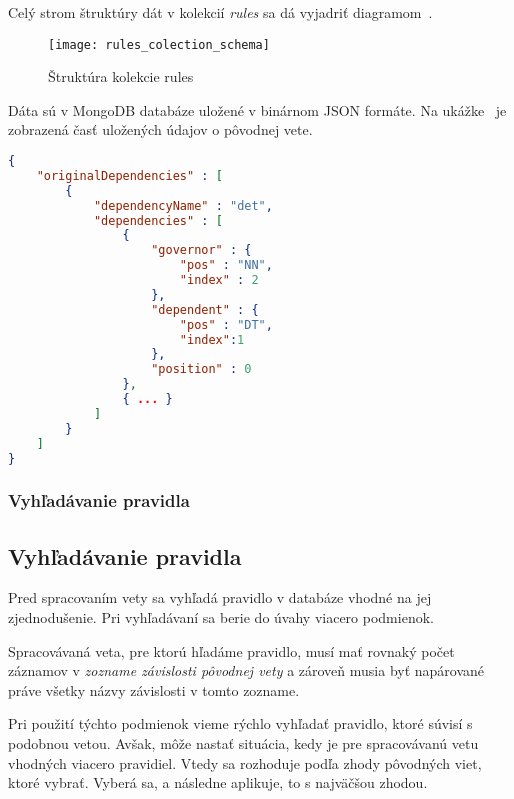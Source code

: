 Celý strom štruktúry dát v kolekcií \textit{rules} sa dá vyjadriť diagramom~.

\begin{figure}[H]
	\begin{center}\texttt{[image: rules\_colection\_schema]}\end{center}
	\caption[Štruktúra kolekcie rules]{Štruktúra kolekcie rules}\label{fig:rules_collection_structure}
\end{figure}

Dáta sú v MongoDB databáze uložené v binárnom JSON formáte. Na ukážke~ je zobrazená časť uložených údajov o pôvodnej vete.

\begin{lstlisting}[language = json, caption={Ukážka dát kolekcie rules}, label = {code:collection_rules_data_example}]
{  
	"originalDependencies" : [  
		{  
			"dependencyName" : "det",
			"dependencies" : [  
				{  
					"governor" : {  
						"pos" : "NN",
						"index" : 2
					},
					"dependent" : {  
						"pos" : "DT",
						"index":1
					},
					"position" : 0
				},
				{ ... }
			]
		}
	]
}
\end{lstlisting}

%
%
{
	\subsubsection{Vyhľadávanie pravidla}
}
{
	\subsection{Vyhľadávanie pravidla}
}
Pred spracovaním vety sa vyhľadá pravidlo v databáze vhodné na jej zjednodušenie. Pri vyhľadávaní sa berie do úvahy viacero podmienok.

Spracovávaná veta, pre ktorú hľadáme pravidlo, musí mať rovnaký počet záznamov v \textit{zozname závislosti pôvodnej vety} a zároveň musia byť napárované práve všetky názvy závislosti v tomto zozname.

Pri použití týchto podmienok vieme rýchlo vyhľadať pravidlo, ktoré súvisí s podobnou vetou. Avšak, môže nastať situácia, kedy je pre spracovávanú vetu vhodných viacero pravidiel. Vtedy sa rozhoduje podľa zhody pôvodných viet, ktoré vybrať. Vyberá sa, a následne aplikuje, to s najväčšou zhodou.

